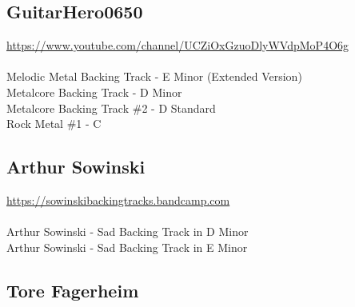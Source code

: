 \subsection{GuitarHero0650}

\url*{https://www.youtube.com/channel/UCZiOxGzuoDlyWVdpMoP4O6g}\\
\ \\
Melodic Metal Backing Track - E Minor (Extended Version)\\
Metalcore Backing Track - D Minor\\
Metalcore Backing Track \#2 - D Standard\\
Rock Metal \#1 - C\\

\subsection{Arthur Sowinski}

\url*{https://sowinskibackingtracks.bandcamp.com}\\
\ \\
Arthur Sowinski - Sad Backing Track in D Minor\\
Arthur Sowinski - Sad Backing Track in E Minor\\

\subsection{Tore Fagerheim}

